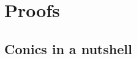 \documentclass[../main.tex]{subfiles}
\begin{document}
\section{Proofs}\label{sec:proofs_appendix}
\subsection{Conics in a nutshell}\label{sec:app1}
\end{document}
